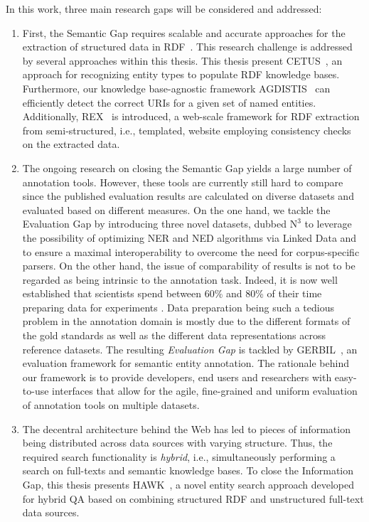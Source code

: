 In this work, three main research gaps will be considered and addressed:
\begin{enumerate}
\item 
First, the Semantic Gap requires scalable and accurate approaches for the extraction of structured data in \ac{RDF}~\cite{rdfprimer}.
This research challenge is addressed by several approaches within this thesis.
This thesis present CETUS~\cite{CETUS_2015}, an approach for recognizing entity types to populate RDF knowledge bases. 
Furthermore, our knowledge base-agnostic framework AGDISTIS~\cite{agdistis_iswc} can efficiently detect the correct URIs for a given set of named entities.
Additionally, REX~\cite{rex} is introduced, a web-scale framework for RDF extraction from semi-structured, i.e., templated, website employing consistency checks on the extracted data.
\item 
The ongoing research on closing the Semantic Gap yields a large number of annotation tools.
However, these tools are currently still hard to compare since the published evaluation results are calculated on diverse datasets and evaluated based on different measures.
On the one hand, we tackle the Evaluation Gap by introducing three novel datasets, dubbed $\mbox{N}^3$ to leverage the possibility of optimizing NER and NED algorithms via Linked Data and to ensure a maximal interoperability to overcome the need for corpus-specific parsers. 
On the other hand, the issue of  comparability of results is not to be regarded as being intrinsic to the annotation task. 
Indeed, it is now well established that scientists spend between 60\% and 80\% of their time preparing data for experiments \cite{GIL2014,jermyn1999preparing,peng2011reproducible}. 
Data preparation being such a tedious problem in the annotation domain is mostly due to the different formats of the gold standards as well as the different data representations across reference datasets.
The resulting \emph{Evaluation Gap} is tackled by GERBIL~\cite{GERBIL}, an evaluation framework for semantic entity annotation. 
The rationale behind our framework is to provide developers, end users and researchers with easy-to-use interfaces that allow for the agile, fine-grained and uniform evaluation of annotation tools on multiple datasets.
\item 
The decentral architecture behind the Web has led to pieces of information being distributed across data sources with varying structure. 
Thus, the required search functionality is \emph{hybrid}, i.e., simultaneously performing a search on full-texts and semantic knowledge bases.
To close the {Information Gap}, this thesis presents HAWK~\cite{hawk_2015}, a novel entity search approach developed for hybrid \ac{QA} based on combining structured RDF and unstructured full-text data sources.
\end{enumerate}

